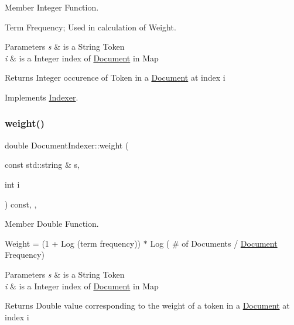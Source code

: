 Member Integer Function. 

Term Frequency; Used in calculation of Weight.


\begin{DoxyParams}{Parameters}
{\em s} & is a String Token \\
\hline
{\em i} & is a Integer index of \hyperlink{class_document}{Document} in Map \\
\hline
\end{DoxyParams}
\begin{DoxyReturn}{Returns}
Integer occurence of Token in a \hyperlink{class_document}{Document} at index i 
\end{DoxyReturn}


Implements \hyperlink{class_indexer_a96e17172c76abb679e7cd2ff4606ce4a}{Indexer}.

\mbox{\label{class_document_indexer_aa637e8bce87c52d0d78bfebe8af02f13}} 
\subsubsection{\texorpdfstring{weight()}{weight()}}
{\footnotesize\ttfamily double Document\+Indexer\+::weight (\begin{DoxyParamCaption}\item[{const std\+::string \&}]{s,  }\item[{int}]{i }\end{DoxyParamCaption}) const\hspace{0.3cm}{\ttfamily [override]}, {\ttfamily [private]}, {\ttfamily [virtual]}}



Member Double Function. 

Weight = (1 + Log (term frequency)) $\ast$ Log ( \# of Documents / \hyperlink{class_document}{Document} Frequency)


\begin{DoxyParams}{Parameters}
{\em s} & is a String Token \\
\hline
{\em i} & is a Integer index of \hyperlink{class_document}{Document} in Map \\
\hline
\end{DoxyParams}
\begin{DoxyReturn}{Returns}
Double value corresponding to the weight of a token in a \hyperlink{class_document}{Document} at index i 
\end{DoxyReturn}


